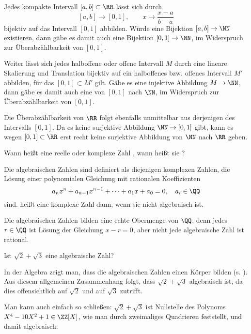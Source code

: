 \begin{antwort}
  Jedes kompakte Intervall $[a,b]\subset \RR$ lässt sich durch 
  \[
  [a,b] \to [0,1], \qquad x \mapsto \frac{x-a}{b-a}
  \]
  bijektiv auf das Intervall $[0,1]$ abbilden. Würde eine Bijektion 
  $[a,b] \to\NN$ existieren, dann gäbe es damit auch eine Bijektion 
  $[0,1] \to \NN$, im Widerspruch zur Überabzählbarkeit von $[0,1]$.

  Weiter lässt sich jedes halboffene oder offene Intervall $M$ 
  durch eine lineare Skalierung und Translation bijektiv auf 
  ein halboffenes bzw. offenes Intervall $M'$ abbilden, für das 
  $[0,1]\subset M'$ gilt. Gäbe es eine injektive Abbildung $M\to \NN$, 
  dann gäbe es damit auch eine von $[0,1]$ nach $\NN$, im Widerspruch 
  zur Überabzählbarkeit von $[0,1]$. 

  Die Überabzählbarkeit von $\RR$ folgt ebenfalls 
  unmittelbar aus derjenigen des Intervalls $[0,1]$. 
  Da es keine surjektive Abbildung $\NN \to [0,1]$ 
  gibt, kann es wegen $[0,1]\subset \RR$ erst recht keine surjektive 
  Abbildung von $\NN$ nach $\RR$ geben.
  \AntEnd
\end{antwort}

\begin{frage}\label{03_alg}
  Wann heißt eine reelle oder komplexe Zahl 
  , wann heißt sie 
  ?
\end{frage}

\begin{antwort}
  Die algebraischen Zahlen sind definiert als diejenigen 
  komplexen Zahlen, die Lösung einer polynomialen Gleichung mit 
  rationalen Koeffizienten
  \[
  a_n x^n + a_{n-1}x^{n-1}+\cdots + a_1x+a_0 =0, \quad a_i \in \QQ
  \]
  sind. 
   heißt eine komplexe Zahl dann, wenn sie nicht 
  algebraisch ist.

  Die algebraischen Zahlen bilden eine echte Obermenge von $\QQ$,  
  denn jedes $r\in \QQ$ ist Lösung der Gleichung $x-r=0$, 
  aber nicht jede algebraische Zahl ist rational. 
  \AntEnd
\end{antwort} 

\begin{frage}
  Ist $\sqrt{2}+\sqrt{3}$ eine algebraische Zahl?
\end{frage}

\begin{antwort}
  In der Algebra zeigt man, dass die algebraischen Zahlen einen 
  Körper bilden (s. {\zB} \citep{Karpfinger}). 
  Aus diesem allgemeinen Zusammenhang folgt, 
  dass $\sqrt{2}+\sqrt{3}$ algebraisch ist, da dies offensichtlich 
  auf $\sqrt{2}$ und auf $\sqrt{3}$ zutrifft.

  \medskip
  \noindent
  Man kann auch einfach so schließen: $\sqrt{2}+\sqrt{3}$ ist Nullstelle 
  des Polynoms $X^4-10X^2+1\in\ZZ[X]$, wie man durch 
  zweimaliges Quadrieren feststellt, und  damit algebraisch.
  \AntEnd
\end{antwort}

